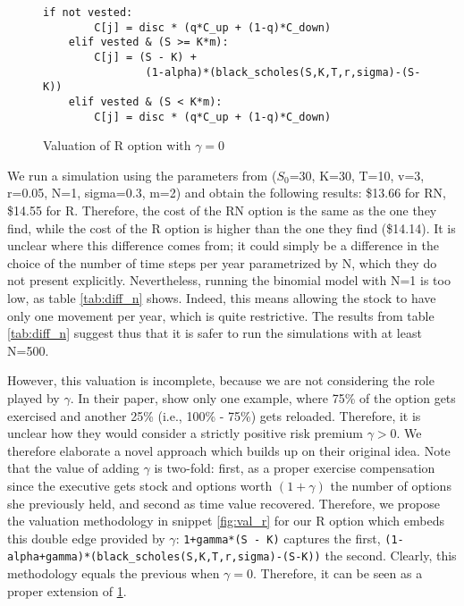 \begin{figure}[H]
    \begin{lstlisting}[breaklines, basicstyle=\ttfamily\small]
    if not vested:                
        C[j] = disc * (q*C_up + (1-q)*C_down)
    elif vested & (S >= K*m): 
        C[j] = (S - K) + 
                (1-alpha)*(black_scholes(S,K,T,r,sigma)-(S-K))
    elif vested & (S < K*m):
        C[j] = disc * (q*C_up + (1-q)*C_down)
    \end{lstlisting}
    \caption{Valuation of R option with $\gamma=0$}
    \label{fig:val_r_gamma0}
\end{figure}

 We run a simulation using the parameters from \cite{huang2013dynamic} ($S_0$=30, K=30, T=10, v=3, r=0.05, N=1, sigma=0.3, m=2) and obtain the following results: \$13.66 for RN, \$14.55 for R. Therefore, the cost of the RN option is the same as the one they find, while the cost of the R option is higher than the one they find (\$14.14). It is unclear where this difference comes from; it could simply be a difference in the choice of the number of time steps per year parametrized by N, which they do not present explicitly. Nevertheless, running the binomial model with N=1 is too low, as table \ref*{tab:diff_n} shows. Indeed, this means allowing the stock to have only one movement per year, which is quite restrictive. The results from table \ref*{tab:diff_n} suggest thus that it is safer to run the simulations with at least N=500.

 

However, this valuation is incomplete, because we are not considering the role played by $\gamma$. In their paper, \cite{huang2013dynamic} show only one example, where 75\% of the option gets exercised and another 25\% (i.e., 100\% - 75\%) gets reloaded. Therefore, it is unclear how they would consider a strictly positive risk premium $\gamma > 0$. 
We therefore elaborate a novel approach which builds up on their original idea. Note that the value of adding $\gamma$ is two-fold: first, as a proper exercise compensation since the executive gets stock and options worth $(1+\gamma)$ the number of options she previously held, and second as time value recovered. Therefore, we propose the valuation methodology in snippet \ref*{fig:val_r} for our R option which embeds this double edge provided by $\gamma$: \verb|1+gamma*(S - K)| captures the first, \verb|(1-alpha+gamma)*(black_scholes(S,K,T,r,sigma)-(S-K))| the second.
Clearly, this methodology equals the previous when $\gamma = 0$. Therefore, it can be seen as a proper extension of \ref*{fig:val_r_gamma0}.

